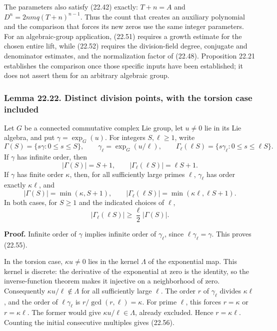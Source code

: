 \documentclass[
  11pt,
  a4paper,
]{article}
\begin{document}
The parameters also satisfy (22.42) exactly: \(T+n=A\) and
\(D^n=2nmq(T+n)^{n-1}\). Thus the count that creates an auxiliary
polynomial and the comparison that forces its new zeros use the same
integer parameters. For an algebraic-group application, (22.51) requires
a growth estimate for the chosen entire lift, while (22.52) requires the
division-field degree, conjugate and denominator estimates, and the
normalization factor of (22.48). Proposition 22.21 establishes the
comparison once those specific inputs have been established; it does not
assert them for an arbitrary algebraic group.

\subsubsection{Lemma 22.22. Distinct division points, with the torsion
case
included}\label{lemma-22.22.-distinct-division-points-with-the-torsion-case-included}

Let \(G\) be a connected commutative complex Lie group, let \(u\ne0\)
lie in its Lie algebra, and put \(\gamma=\exp_G(u)\). For integers
\(S,\ell\ge1\), write \[
 \Gamma(S)=\{s\gamma:0\le s\le S\},\qquad
 \gamma_\ell=\exp_G(u/\ell),\qquad
 \Gamma_\ell(\ell S)=\{s\gamma_\ell:0\le s\le\ell S\}.
 \tag{22.54}
\] If \(\gamma\) has infinite order, then \[
 |\Gamma(S)|=S+1,\qquad |\Gamma_\ell(\ell S)|=\ell S+1.
 \tag{22.55}
\] If \(\gamma\) has finite order \(\kappa\), then, for all sufficiently
large primes \(\ell\), \(\gamma_\ell\) has order exactly \(\kappa\ell\),
and \[
 |\Gamma(S)|=\min(\kappa,S+1),\qquad
 |\Gamma_\ell(\ell S)|=\min(\kappa\ell,\ell S+1).
 \tag{22.56}
\] In both cases, for \(S\ge1\) and the indicated choices of \(\ell\),
\[
 |\Gamma_\ell(\ell S)|\ge\frac\ell2|\Gamma(S)|.
 \tag{22.57}
\]

\textbf{Proof.} Infinite order of \(\gamma\) implies infinite order of
\(\gamma_\ell\), since \(\ell\gamma_\ell=\gamma\). This proves (22.55).

In the torsion case, \(\kappa u\ne0\) lies in the kernel \(\Lambda\) of
the exponential map. This kernel is discrete: the derivative of the
exponential at zero is the identity, so the inverse-function theorem
makes it injective on a neighborhood of zero. Consequently
\(\kappa u/\ell\notin\Lambda\) for all sufficiently large \(\ell\). The
order \(r\) of \(\gamma_\ell\) divides \(\kappa\ell\), and the order of
\(\ell\gamma_\ell\) is \(r/\gcd(r,\ell)=\kappa\). For prime \(\ell\),
this forces \(r=\kappa\) or \(r=\kappa\ell\). The former would give
\(\kappa u/\ell\in\Lambda\), already excluded. Hence \(r=\kappa\ell\).
Counting the initial consecutive multiples gives (22.56).
\end{document}
